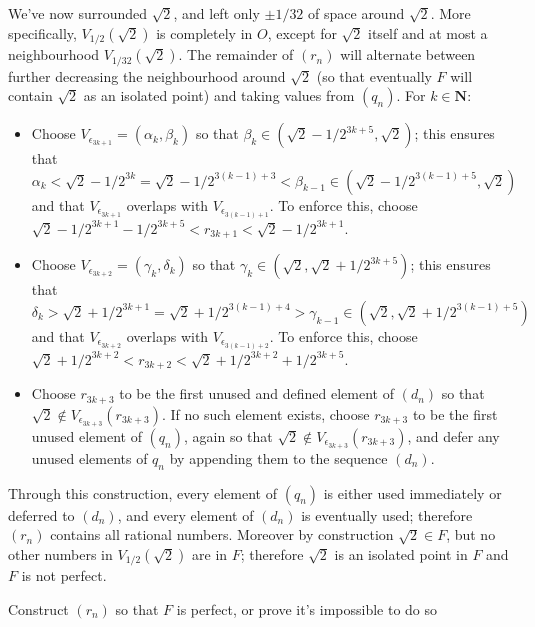 \begin{solution}
{We've now surrounded \(\sqrt{2}\), and left only \(\pm 1/32\) of space around \(\sqrt{2}\). More specifically, \(V_{1/2}(\sqrt{2})\) is completely in \(O\), except for \(\sqrt{2}\) itself and at most a neighbourhood \(V_{1/32}(\sqrt{2})\). The remainder of \((r_n)\) will alternate between further decreasing the neighbourhood around \(\sqrt{2}\) (so that eventually \(F\) will contain \(\sqrt{2}\) as an isolated point) and taking values from \((q_n)\). For \(k \in \mathbf{N}\):

\begin{itemize}
    \item Choose \(V_{\epsilon_{3k + 1}} = (\alpha_k, \beta_k)\) so that \(\beta_k \in (\sqrt{2} - 1 / 2^{3k + 5}, \sqrt{2})\); this ensures that \(\alpha_k < \sqrt{2} - 1/2^{3k} = \sqrt{2} - 1/2 ^ {3(k-1) + 3} < \beta_{k-1} \in (\sqrt{2} - 1/2^{3(k-1) + 5}, \sqrt{2})\) and that \(V_{\epsilon_{3k + 1}}\) overlaps with \(V_{\epsilon_{3(k-1) + 1}}\). To enforce this, choose  \(\sqrt{2} - 1/2^{3k+1} - 1/2^{3k + 5} < r_{3k + 1} < \sqrt{2} - 1 / 2^{3k + 1} \).

    \item Choose \(V_{\epsilon_{3k + 2}} = (\gamma_k, \delta_k)\) so that \(\gamma_k \in (\sqrt{2}, \sqrt{2} + 1 / 2^{3k + 5})\); this ensures that \(\delta_k > \sqrt{2} + 1/2^{3k + 1} = \sqrt{2} + 1/2 ^ {3(k-1) + 4} > \gamma_{k-1} \in (\sqrt{2}, \sqrt{2} + 1/2^{3(k-1) + 5})\) and that \(V_{\epsilon_{3k + 2}}\) overlaps with \(V_{\epsilon_{3(k-1) + 2}}\). To enforce this, choose  \(\sqrt{2} + 1/2^{3k+2} < r_{3k + 2} < \sqrt{2} + 1 / 2^{3k + 2} + 1/2^{3k + 5} \).

    \item Choose \(r_{3k + 3}\) to be the first unused and defined element of \((d_n)\) so that \(\sqrt{2} \notin V_{\epsilon_{3k + 3}}(r_{3k + 3})\). If no such element exists, choose \(r_{3k + 3}\) to be the first unused element of \((q_n)\), again so that \(\sqrt{2} \notin V_{\epsilon_{3k + 3}}(r_{3k + 3})\), and defer any unused elements of \(q_n\) by appending them to the sequence \((d_n)\).
\end{itemize}

Through this construction, every element of \((q_n)\) is either used immediately or deferred to \((d_n)\), and every element of \((d_n)\) is eventually used; therefore \((r_n)\) contains all rational numbers. Moreover by construction \(\sqrt{2} \in F\), but no other numbers in \(V_{1/2}(\sqrt{2})\) are in \(F\); therefore \(\sqrt{2}\) is an isolated point in \(F\) and \(F\) is not perfect.

\TODO Construct \((r_n)\) so that \(F\) is perfect, or prove it's impossible to do so
  }

\end{solution}

